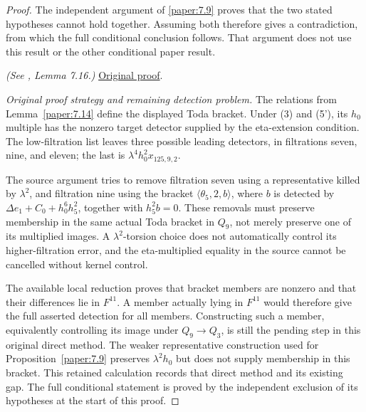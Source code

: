 \begin{lemma}[Detection of the synthetic Toda bracket]
\end{lemma}
\begin{proof}
The independent argument of \ref{paper:7.9} proves that the two stated hypotheses cannot hold together. Assuming both therefore gives a contradiction, from which the full conditional conclusion follows. That argument does not use this result or the other conditional paper result.

\textit{(See \cite{LWX126}, Lemma 7.16.)} \href{paper/main.tex.html#L2482}{Original proof}.

\textit{Original proof strategy and remaining detection problem.} The relations from Lemma~\ref{paper:7.14} define the displayed Toda bracket. Under (3) and (5'), its $h_0$ multiple has the nonzero target detector supplied by the eta-extension condition. The low-filtration list leaves three possible leading detectors, in filtrations seven, nine, and eleven; the last is $\lambda^4h_0^2x_{125,9,2}$.

The source argument tries to remove filtration seven using a representative killed by $\lambda^2$, and filtration nine using the bracket $\langle\theta_5,2,b\rangle$, where $b$ is detected by $\Delta e_1+C_0+h_0^6h_5^2$, together with $h_5^2b=0$. These removals must preserve membership in the same actual Toda bracket in $Q_9$, not merely preserve one of its multiplied images. A $\lambda^2$-torsion choice does not automatically control its higher-filtration error, and the eta-multiplied equality in the source cannot be cancelled without kernel control.

The available local reduction proves that bracket members are nonzero and that their differences lie in $F^{11}$. A member actually lying in $F^{11}$ would therefore give the full asserted detection for all members. Constructing such a member, equivalently controlling its image under $Q_9\to Q_3$, is still the pending step in this original direct method. The weaker representative construction used for Proposition~\ref{paper:7.9} preserves $\lambda^2h_0$ but does not supply membership in this bracket. This retained calculation records that direct method and its existing gap. The full conditional statement is proved by the independent exclusion of its hypotheses at the start of this proof.
\end{proof}

